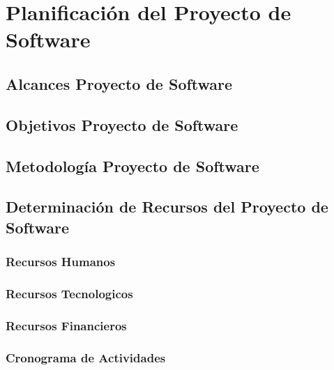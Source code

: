 \chapter{Planificaci\'on del Proyecto de Software}
\section{Alcances Proyecto de Software}
\section{Objetivos Proyecto de Software}
\section{Metodolog\'ia Proyecto de Software}
\section{Determinaci\'on de Recursos del Proyecto de Software}
\subsection{Recursos Humanos} 
\subsection{Recursos Tecnologicos}
\subsection{Recursos Financieros} 
\subsection{Cronograma de Actividades}
